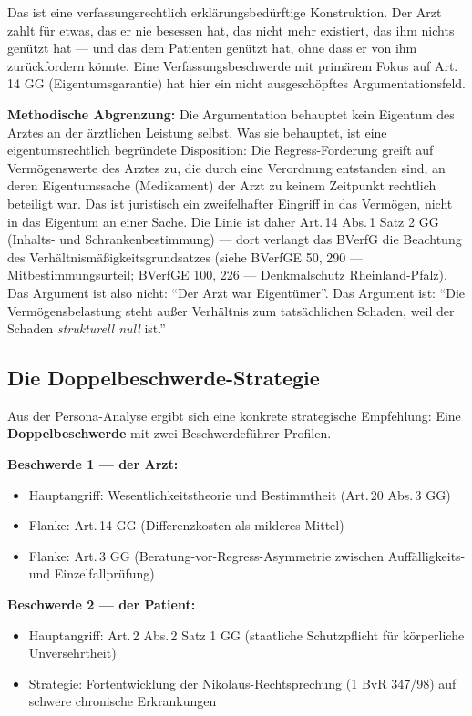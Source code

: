 \documentclass{umbruch-position}
\begin{document}
Das ist eine verfassungsrechtlich erklärungsbedürftige Konstruktion. Der Arzt zahlt für etwas, das er nie besessen hat, das nicht mehr existiert, das ihm nichts genützt hat — und das dem Patienten genützt hat, ohne dass er von ihm zurückfordern könnte. Eine Verfassungsbeschwerde mit primärem Fokus auf Art.\,14 GG (Eigentumsgarantie) hat hier ein nicht ausgeschöpftes Argumentationsfeld.

\textbf{Methodische Abgrenzung:} Die Argumentation behauptet kein Eigentum des Arztes an der ärztlichen Leistung selbst. Was sie behauptet, ist eine eigentumsrechtlich begründete Disposition: Die Regress-Forderung greift auf Vermögenswerte des Arztes zu, die durch eine Verordnung entstanden sind, an deren Eigentumssache (Medikament) der Arzt zu keinem Zeitpunkt rechtlich beteiligt war. Das ist juristisch ein zweifelhafter Eingriff in das Vermögen, nicht in das Eigentum an einer Sache. Die Linie ist daher Art.\,14 Abs.\,1 Satz 2 GG (Inhalts- und Schrankenbestimmung) — dort verlangt das BVerfG die Beachtung des Verhältnismäßigkeitsgrundsatzes (siehe BVerfGE 50, 290 — Mitbestimmungsurteil; BVerfGE 100, 226 — Denkmalschutz Rheinland-Pfalz). Das Argument ist also nicht: ``Der Arzt war Eigentümer''. Das Argument ist: ``Die Vermögensbelastung steht außer Verhältnis zum tatsächlichen Schaden, weil der Schaden \textit{strukturell null} ist.''

\subsection{Die Doppelbeschwerde-Strategie}

Aus der Persona-Analyse ergibt sich eine konkrete strategische Empfehlung: Eine \textbf{Doppelbeschwerde} mit zwei Beschwerdeführer-Profilen.

\textbf{Beschwerde 1 — der Arzt:}
\begin{itemize}[nosep]
  \item Hauptangriff: Wesentlichkeitstheorie und Bestimmtheit (Art.\,20 Abs.\,3 GG)
  \item Flanke: Art.\,14 GG (Differenzkosten als milderes Mittel)
  \item Flanke: Art.\,3 GG (Beratung-vor-Regress-Asymmetrie zwischen Auffälligkeits- und Einzelfallprüfung)
\end{itemize}

\textbf{Beschwerde 2 — der Patient:}
\begin{itemize}[nosep]
  \item Hauptangriff: Art.\,2 Abs.\,2 Satz 1 GG (staatliche Schutzpflicht für körperliche Unversehrtheit)
  \item Strategie: Fortentwicklung der Nikolaus-Rechtsprechung (1 BvR 347/98) auf schwere chronische Erkrankungen
\end{itemize}
\end{document}
